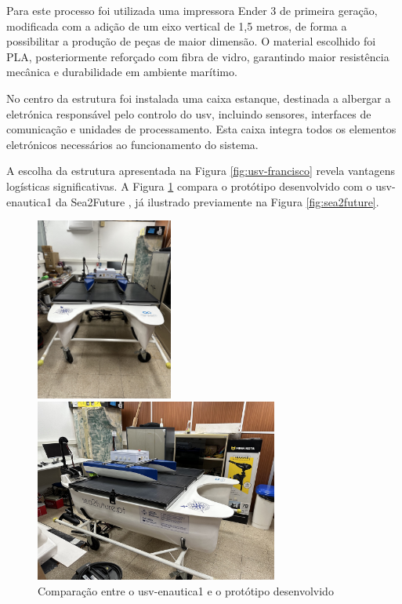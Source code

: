 Para este processo foi utilizada uma impressora Ender 3 de primeira geração, modificada com a adição de um eixo vertical de 1,5 metros, de forma a possibilitar a produção de peças de maior dimensão. O material escolhido foi PLA, posteriormente reforçado com fibra de vidro, garantindo maior resistência mecânica e durabilidade em ambiente marítimo. 

No centro da estrutura foi instalada uma caixa estanque, destinada a albergar a eletrónica responsável pelo controlo do \gls{usv}, incluindo sensores, interfaces de comunicação e unidades de processamento. Esta caixa integra todos os elementos eletrónicos necessários ao funcionamento do sistema. 

A escolha da estrutura apresentada na Figura \ref{fig:usv-francisco} revela vantagens logísticas significativas. A Figura \ref{fig:pcb-esquematica-vs-real} compara o protótipo desenvolvido com o \gls{usv}-enautica1 da Sea2Future \cite{sea2future, sea2future2}, já ilustrado previamente na Figura \ref{fig:sea2future}.

\begin{figure}[H]
    \centering
    \begin{minipage}{0.39\linewidth}
        \centering
        \includegraphics[height=6cm]{figuras/usv-1-2-1.jpg}
    \end{minipage}
    \hfill
    \begin{minipage}{0.59\linewidth}
        \centering
        \includegraphics[height=6cm]{figuras/usv-1-2-2.jpg}
    \end{minipage}
    \caption{Comparação entre o \gls{usv}-enautica1 e o protótipo desenvolvido}
    \label{fig:pcb-esquematica-vs-real}
\end{figure}

